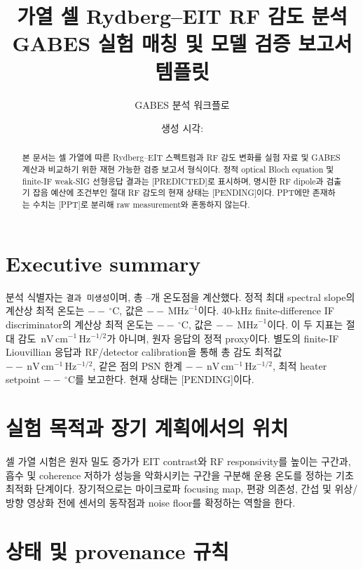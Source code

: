 \documentclass[11pt,a4paper]{article}
\title{\textbf{가열 셀 Rydberg--EIT RF 감도 분석}\\[3pt]
\large GABES 실험 매칭 및 모델 검증 보고서 템플릿}
\author{GABES 분석 워크플로}
\date{생성 시각: \AnalysisGeneratedUTC}
\providecommand{\AnalysisIdentifier}{결과 미생성}
\providecommand{\ModelTemperatureCount}{--}
\providecommand{\SlopeOptimumTemperatureC}{--}
\providecommand{\SlopeOptimumValue}{--}
\providecommand{\IFOptimumTemperatureC}{--}
\providecommand{\IFOptimumValue}{--}
\providecommand{\AbsoluteSensitivityStatus}{PENDING}
\providecommand{\SensitivityOptimumTemperatureC}{--}
\providecommand{\TotalSensitivityOptimum}{--}
\providecommand{\PSNSensitivityAtOptimum}{--}
\newcommand{\Status}[1]{\textsf{[#1]}}
\newcommand{\MHz}{\,\mathrm{MHz}}
\newcommand{\nVsens}{\,\mathrm{nV\,cm^{-1}\,Hz^{-1/2}}}
\begin{document}
\maketitle

\begin{abstract}
본 문서는 셀 가열에 따른 Rydberg--EIT 스펙트럼과 RF 감도 변화를
실험 자료 및 GABES 계산과 비교하기 위한 재현 가능한 검증 보고서 형식이다.
정적 optical Bloch equation 및 finite-IF weak-SIG 선형응답 결과는
\Status{PREDICTED}로 표시하며, 명시한 RF dipole과 검출기 잡음 예산에 조건부인
절대 RF 감도의 현재 상태는 \Status{\AbsoluteSensitivityStatus}이다.
PPT에만 존재하는 수치는
\Status{PPT}로 분리해 raw measurement와 혼동하지 않는다.
\end{abstract}

\tableofcontents

\section{Executive summary}

분석 식별자는 \texttt{\AnalysisIdentifier}이며,
총 \ModelTemperatureCount{}개 온도점을 계산했다.
정적 최대 spectral slope의 계산상 최적 온도는
\(\SlopeOptimumTemperatureC\,^{\circ}\mathrm{C}\), 값은
\(\SlopeOptimumValue\MHz^{-1}\)이다.
40-kHz finite-difference IF discriminator의 계산상 최적 온도는
\(\IFOptimumTemperatureC\,^{\circ}\mathrm{C}\), 값은
\(\IFOptimumValue\MHz^{-1}\)이다.
이 두 지표는 절대 감도 \(\nVsens\)가 아니며, 원자 응답의 정적 proxy이다.
별도의 finite-IF Liouvillian 응답과 RF/detector calibration을 통해 총 감도 최적값
\(\TotalSensitivityOptimum\nVsens\), 같은 점의 PSN 한계
\(\PSNSensitivityAtOptimum\nVsens\), 최적 heater setpoint
\(\SensitivityOptimumTemperatureC\,^{\circ}\mathrm{C}\)를 보고한다.
현재 상태는 \Status{\AbsoluteSensitivityStatus}이다.

\section{실험 목적과 장기 계획에서의 위치}

셀 가열 시험은 원자 밀도 증가가 EIT contrast와 RF responsivity를 높이는 구간과,
흡수 및 coherence 저하가 성능을 악화시키는 구간을 구분해 운용 온도를 정하는
기초 최적화 단계이다. 장기적으로는 마이크로파 focusing map, 편광 의존성,
간섭 및 위상/방향 영상화 전에 센서의 동작점과 noise floor를 확정하는 역할을 한다.

\section{상태 및 provenance 규칙}
\end{document}
